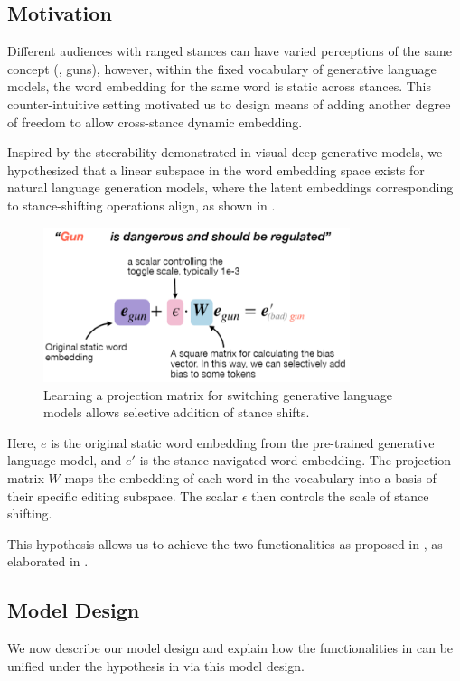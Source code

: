 \subsection{Motivation}
\label{switch-motivation}
Different audiences with ranged stances can have varied perceptions of the same concept (\eg, guns), however, within the fixed vocabulary of generative language models, the word embedding for the same word is static across stances. This counter-intuitive setting motivated us to design means of adding another degree of freedom to allow cross-stance dynamic embedding.

Inspired by the steerability demonstrated in visual deep generative models, we hypothesized that a linear subspace in the word embedding space exists for natural language generation models, where the latent embeddings corresponding to stance-shifting operations align, as shown in . 
\begin{figure}[h]
    \centering
    \includegraphics[width=0.8\textwidth]{img/switchLM.png}
    \caption{Learning a projection matrix for switching generative language models allows selective addition of stance shifts. }
    \label{fig:switch-lm}
\end{figure}

Here, $e$ is the original static word embedding from the pre-trained generative language model, and $e'$ is the stance-navigated word embedding. The projection matrix $W$ maps the embedding of each word in the vocabulary into a basis of their specific editing subspace. The scalar $\epsilon$ then controls the scale of stance shifting.

This hypothesis allows us to achieve the two functionalities as proposed in , as elaborated in .

\subsection{Model Design}
\label{switch-model}
We now describe our model design and explain how the functionalities in  can be unified under the hypothesis in  via this model design.

